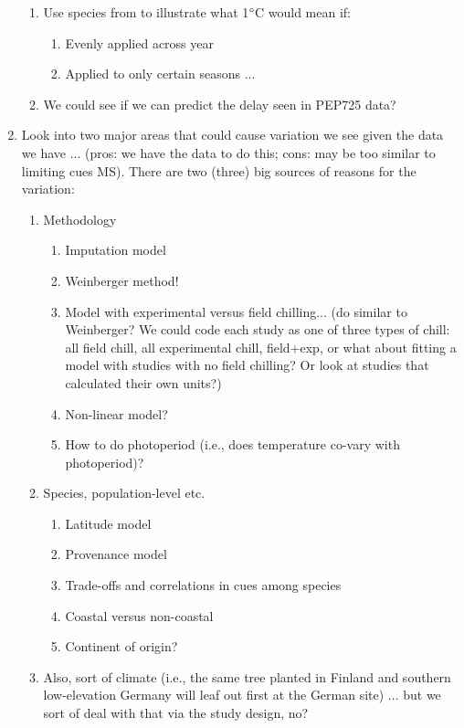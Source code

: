 \documentclass[11pt,letterpaper]{article}
\begin{document}
\begin{enumerate}
\begin{enumerate}
\item Use species from \citep{fu2015} to illustrate what 1$\degree$C would mean if:
\begin{enumerate}
\item Evenly applied across year
\item Applied to only certain seasons ... 
\end{enumerate}
\item We could see if we can predict the delay seen in PEP725 data? 
\end{enumerate}
\item Look into two major areas that could cause variation we see given the data we have ... (pros: we have the data to do this; cons: may be too similar to limiting cues MS). There are two (three) big sources of reasons for the variation:
\begin{enumerate}
\item Methodology
\begin{enumerate}
\item Imputation model
\item Weinberger method! 
\item Model with experimental versus field chilling... (do similar to Weinberger? We could code each study as one of three types of chill: all field chill, all experimental chill, field+exp, or what about fitting a model with studies with no field chilling? Or look at studies that calculated their own units?)
\item Non-linear model?
\item How to do photoperiod (i.e., does temperature co-vary with photoperiod)?
\end{enumerate}
\item Species, population-level etc.
\begin{enumerate}
\item Latitude model
\item Provenance model
\item Trade-offs and correlations in cues among species 
\item Coastal versus non-coastal
\item Continent of origin?
\end{enumerate}
\item Also, sort of climate (i.e., the same tree planted in Finland and southern low-elevation Germany will leaf out first at the German site) ... but we sort of deal with that via the study design, no?
\end{enumerate}
\end{enumerate}



\newpage


\end{document}
